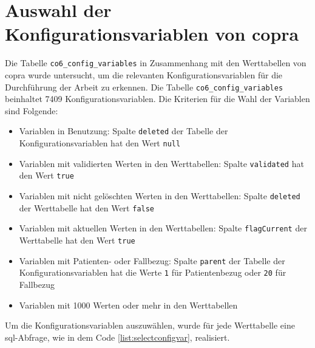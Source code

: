 \section{Auswahl der Konfigurationsvariablen von \acs{copra}} \label{sec:configvarcopra}

Die Tabelle \texttt{co6\_config\_variables} in Zusammenhang mit den Werttabellen von \ac{copra} wurde untersucht, um die relevanten Konfigurationsvariablen für die Durchführung der Arbeit zu erkennen. Die Tabelle \texttt{co6\_config\_variables} beinhaltet 7409 Konfigurationsvariablen.
\newpage
Die Kriterien für die Wahl der Variablen sind Folgende:

\begin{itemize}
	\item Variablen in Benutzung: Spalte \texttt{deleted} der Tabelle der Konfigurationsvariablen hat den Wert \texttt{null}
	\item Variablen mit validierten Werten in den Werttabellen: Spalte \texttt{validated} hat den Wert \texttt{true}
	\item Variablen mit nicht gelöschten Werten in den Werttabellen: Spalte \texttt{deleted} der Werttabelle hat den Wert \texttt{false}
	\item Variablen mit aktuellen Werten in den Werttabellen: Spalte \texttt{flagCurrent} der Werttabelle hat den Wert \texttt{true}
	\item Variablen mit Patienten- oder Fallbezug: Spalte \texttt{parent} der Tabelle der Konfigurationsvariablen hat die Werte \texttt{1} für Patientenbezug oder \texttt{20} für Fallbezug
	\item Variablen mit 1000 Werten oder mehr in den Werttabellen
\end{itemize}

Um die Konfigurationsvariablen auszuwählen, wurde für jede Werttabelle eine \ac{sql}-Abfrage, wie in dem Code \ref{list:selectconfigvar}, realisiert.

